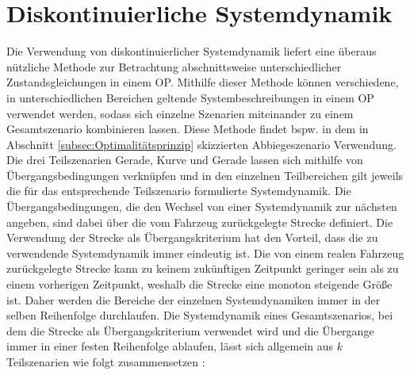 \section{Diskontinuierliche Systemdynamik}\label{sec:Diskontinuität}
Die Verwendung von diskontinuierlicher Systemdynamik liefert eine überaus nützliche Methode zur Betrachtung abschnittsweise unterschiedlicher Zustandsgleichungen in einem \gls{OP}. Mithilfe dieser Methode können verschiedene, in unterschiedlichen Bereichen geltende Systembeschreibungen in einem \gls{OP} verwendet werden, sodass sich einzelne Szenarien miteinander zu einem Gesamtszenario kombinieren lassen. Diese Methode findet bspw. in dem in Abschnitt \ref{subsec:Optimalitätsprinzip} skizzierten Abbiegeszenario Verwendung. Die drei Teilszenarien Gerade, Kurve und Gerade lassen sich mithilfe von Übergangsbedingungen verknüpfen und in den einzelnen Teilbereichen gilt jeweils die für das entsprechende Teilszenario formulierte Systemdynamik. Die Übergangsbedingungen, die den Wechsel von einer Systemdynamik zur nächsten angeben, sind dabei über die vom Fahrzeug zurückgelegte Strecke definiert. Die Verwendung der Strecke als Übergangskriterium hat den Vorteil, dass die zu verwendende Systemdynamik immer eindeutig ist. Die von einem realen Fahrzeug zurückgelegte Strecke kann zu keinem zukünftigen Zeitpunkt geringer sein als zu einem vorherigen Zeitpunkt, weshalb die Strecke eine monoton steigende Größe ist. Daher werden die Bereiche der einzelnen Systemdynamiken immer in der selben Reihenfolge durchlaufen. Die Systemdynamik eines Gesamtszenarios, bei dem die Strecke als Übergangskriterium verwendet wird und die Übergange immer in einer festen Reihenfolge ablaufen, lässt sich allgemein aus $k$ Teilszenarien wie folgt zusammensetzen \cite{Papageorgiou.2012}:
